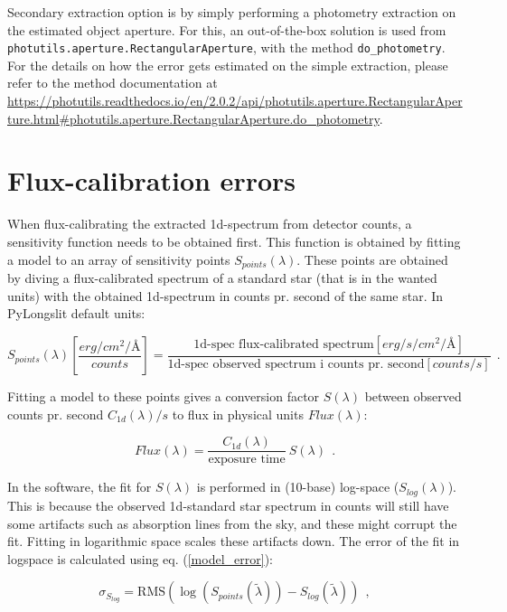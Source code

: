 \documentclass{article}
\begin{document}
Secondary extraction option is by simply performing a photometry extraction on the estimated object aperture. For this, an out-of-the-box solution is used from \verb|photutils.aperture.RectangularAperture|, with the method \verb|do_photometry|. For the details on how the error gets estimated on the simple extraction, please refer to the method documentation at \url{https://photutils.readthedocs.io/en/2.0.2/api/photutils.aperture.RectangularAperture.html#photutils.aperture.RectangularAperture.do_photometry}.

\section{Flux-calibration errors}

When flux-calibrating the extracted 1d-spectrum from detector counts, a sensitivity function needs to be obtained first. This function is obtained by fitting a model to an array of sensitivity points $S_{points}(\lambda)$. These points are obtained by diving a flux-calibrated spectrum of a standard star (that is in the wanted units) with the obtained 1d-spectrum in counts pr. second of the same star. In PyLongslit default units:

\begin{equation}
    S_{points}(\lambda) \left[\frac{erg/cm^2/\textit{Å}}{counts}\right] = \frac{\text{1d-spec flux-calibrated spectrum} \left[erg/s/cm^2/\textit{Å}\right]}{\text{1d-spec observed spectrum i counts pr. second} \left[counts/s\right]} \ \ .
\end{equation}

\noindent Fitting a model to these points gives a conversion factor $S(\lambda)$  between observed counts pr. second $C_{1d}(\lambda)/s$ to flux in physical units $Flux(\lambda)$:

\begin{equation}\label{flux}
    Flux(\lambda) =  \frac{C_{1d}(\lambda)}{\text{exposure time}} \ S(\lambda) \ \ .
\end{equation}

\noindent In the software, the fit for $S(\lambda)$ is performed in (10-base) log-space ($S_{log}(\lambda)$). This is because the observed 1d-standard star spectrum in counts will still have some artifacts such as absorption lines from the sky, and these might corrupt the fit. Fitting in logarithmic space scales these artifacts down. The error of the fit in logspace is calculated using eq. (\ref{model_error}):

\begin{equation}
    \sigma_{S_{log}} = \text{RMS}(\log{(S_{points}(\tilde{\lambda}))} - S_{log}(\tilde{\lambda})) \ \ ,
\end{equation}
\end{document}
